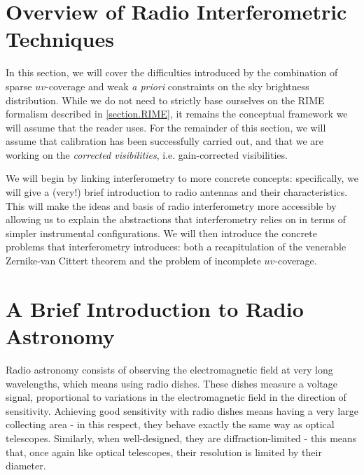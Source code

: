 
\section{Overview of Radio Interferometric Techniques}\label{section.imaging}

\pg
In this section, we will cover the difficulties introduced by the combination of sparse $uv$-coverage and weak \emph{a priori} constraints on the sky brightness distribution. While we do not need to strictly base ourselves on the RIME formalism described in \cref{section.RIME}, it remains the conceptual framework we will assume that the reader uses. For the remainder of this section, we will assume that calibration has been successfully carried out, and that we are working on the \emph{corrected visibilities}, i.e. gain-corrected visibilities. 

\pg
We will begin by linking interferometry to more concrete concepts: specifically, we will give a (very!) brief introduction to radio antennas and their characteristics. This will make the ideas and basis of radio interferometry more accessible by allowing us to explain the abstractions that interferometry relies on in terms of simpler instrumental configurations. We will then introduce the concrete problems that interferometry introduces: both a recapitulation of the venerable Zernike-van Cittert theorem \citep[cf.][]{1934Phy.....1..201V} and the problem of incomplete $uv$-coverage.


%
%

\section{A Brief Introduction to Radio Astronomy}

\pg
Radio astronomy consists of observing the electromagnetic field at very long wavelengths, which means using radio dishes. These dishes measure a voltage signal, proportional to variations in the electromagnetic field in the direction of sensitivity. Achieving good sensitivity with radio dishes means having a very large collecting area - in this respect, they behave exactly the same way as optical telescopes. Similarly, when well-designed, they are diffraction-limited - this means that, once again like optical telescopes, their resolution is limited by their diameter.

